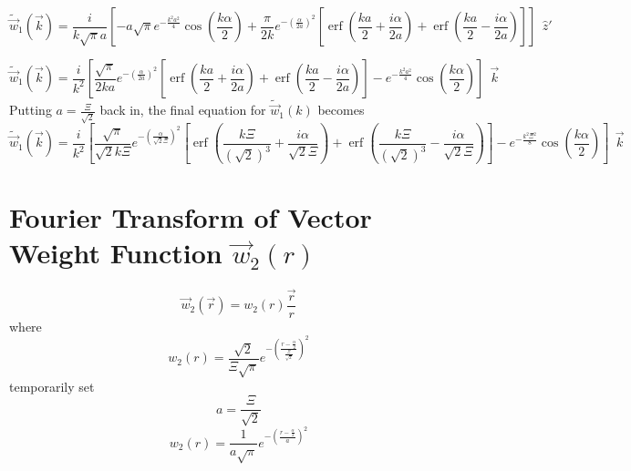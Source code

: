 \documentclass[double,12pt]{beavtex}
\begin{document}
\begin{equation}{\widetilde{\vec{w}}_1(\vec{k})=\frac{i}{k\sqrt{\pi}a}\left[-a\sqrt{\pi}e^{-\frac{k^2a^2}{4}}\cos\left(\frac{k\alpha}{2}\right)+\frac{\pi}{2k}e^{-\left(\frac{\alpha}{2a}\right)^2}\left[\operatorname{erf}\left(\frac{ka}{2}+\frac{i\alpha}{2a}\right)+\operatorname{erf}\left(\frac{ka}{2}-\frac{i\alpha}{2a}\right)\right]\right]{~~}\hat{z}'}\end{equation}

\begin{equation}{\widetilde{\vec{w}}_1(\vec{k})=\frac{i}{k^2}\left[\frac{\sqrt{\pi}}{2ka}e^{-\left(\frac{\alpha}{2a}\right)^2}\left[\operatorname{erf}\left(\frac{ka}{2}+\frac{i\alpha}{2a}\right)+\operatorname{erf}\left(\frac{ka}{2}-\frac{i\alpha}{2a}\right)\right]-e^{-\frac{k^2a^2}{4}}\cos\left(\frac{k\alpha}{2}\right)\right]{~~}\vec{k}}\end{equation}
Putting $a=\frac{\Xi}{\sqrt{2}}$ back in, the final equation for $\widetilde{\vec{w}}_1(k)$ becomes
\begin{equation}{\widetilde{\vec{w}}_1(\vec{k})=\frac{i}{k^2}\left[\frac{\sqrt{\pi}}{\sqrt{2}k\Xi}e^{-\left(\frac{\alpha}{\sqrt{2}\Xi}\right)^2}\left[\operatorname{erf}\left(\frac{k\Xi}{(\sqrt{2})^3}+\frac{i\alpha}{\sqrt{2}\Xi}\right)+\operatorname{erf}\left(\frac{k\Xi}{(\sqrt{2})^3}-\frac{i\alpha}{\sqrt{2}\Xi}\right)\right]-e^{-\frac{k^2\Xi^2}{8}}\cos\left(\frac{k\alpha}{2}\right)\right]{~~}\vec{k}}\end{equation}

\section{Fourier Transform of Vector Weight Function $\vec{w}_{2}(r)$}
\begin{equation}{\vec{w}_2(\vec{r})=w_2(r)\frac{\vec{r}}{r}}\end{equation}
where
\begin{equation}{w_2(r)=\frac{\sqrt{2}}{\Xi\sqrt{\pi}}e^{-\left(\frac{r-\frac{\alpha}{2}}{\frac{\Xi}{\sqrt{2}}}\right)^2}}\end{equation}
temporarily set 
\begin{equation}{a=\frac{\Xi}{\sqrt{2}}}\end{equation}
\begin{equation}{w_2(r)=\frac{1}{a\sqrt{\pi}}e^{-\left(\frac{r-\frac{\alpha}{2}}{a}\right)^2}}\end{equation}
\end{document}
